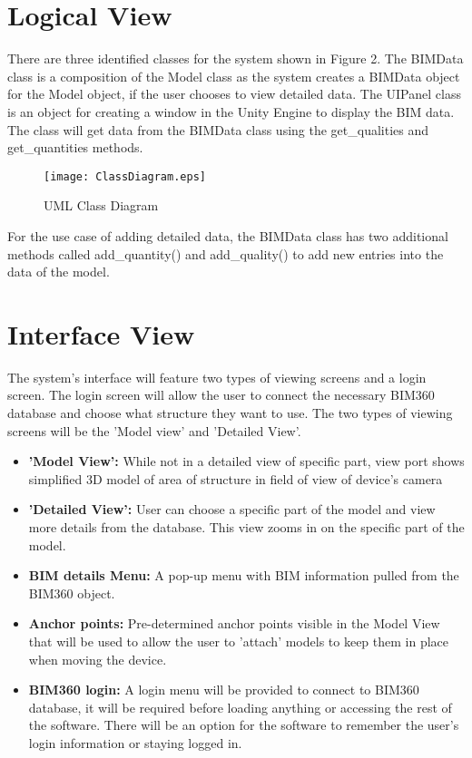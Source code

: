 \documentclass[onecolumn, draftclsnofoot,10pt, compsoc]{IEEEtran}
\begin{document}
\section{Logical View}
There are three identified classes for the system shown in Figure 2.
The BIMData class is a composition of the Model class as the system creates a BIMData object for the Model object, if the user chooses to view detailed data.
The UIPanel class is an object for creating a window in the Unity Engine to display the BIM data.
The class will get data from the BIMData class using the get\_qualities and get\_quantities methods.\par
\begin{figure}[ht]
    \centering
    \texttt{[image: ClassDiagram.eps]}
    \caption{UML Class Diagram}
    \label{fig:ClassDiagram}
\end{figure}
For the use case of adding detailed data, the BIMData class has two additional methods called add\_quantity() and add\_quality() to add new entries into the data of the model.\par

\section{Interface View}
The system's interface will feature two types of viewing screens and a login screen. The login screen will allow the user to connect the necessary BIM360 database and choose what structure they want to use. The two types of viewing screens will be the 'Model view' and 'Detailed View'.
\begin{itemize}
    \item \textbf{'Model View':} While not in a detailed view of specific part, view port shows simplified 3D model of area of structure in field of view of device's camera
    \item \textbf{'Detailed View':} User can choose a specific part of the model and view more details from the database.  This view zooms in on the specific part of the model.
    \item \textbf{BIM details Menu:} A pop-up menu with BIM information pulled from the BIM360 object.
    \item \textbf{Anchor points:} Pre-determined anchor points visible in the Model View that will be used to allow the user to 'attach' models to keep them in place when moving the device.
    \item \textbf{BIM360 login:} A login menu will be provided to connect to BIM360 database, it will be required before loading anything or accessing the rest of the software. There will be an option for the software to remember the user's login information or staying logged in.
\end{itemize}
\end{document}
